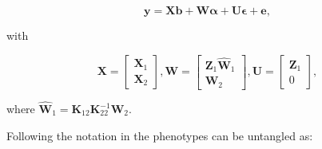\documentclass[12pt,titlepage]{article}
\begin{document}
\begin{equation} \label{eq:single-step-model}
\mathbf{y} = \mathbf{Xb} + \mathbf{W} \boldsymbol{\alpha} + \mathbf{U} \boldsymbol{\epsilon} + \mathbf{e},
\end{equation}

with

\begin{equation} \label{eq:single-step-submatrices}
\mathbf{X} =
\begin{bmatrix}
  \mathbf{X}_1 \\
  \mathbf{X}_2
 \end{bmatrix},
 \mathbf{W} =
\begin{bmatrix}
  \mathbf{Z}_1\mathbf{\hat{W}}_{1} \\
  \mathbf{W}_2
 \end{bmatrix},
 \mathbf{U} =
\begin{bmatrix}
  \mathbf{Z}_1 \\
  0
 \end{bmatrix},
\end{equation}

where $\mathbf{\hat{W}}_{1} = \mathbf{K}_{12} 
\mathbf{K}^{-1}_{22} \mathbf{W}_{2}$.

Following the notation in  the phenotypes can be untangled 
as:
\end{document}
